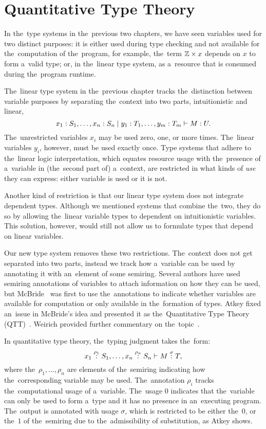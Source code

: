 \chapter{Quantitative Type Theory}\label{cha:qtt}

In the~type systems in the~previous two chapters, we have seen variables used
for two distinct purposes: it is either used during type checking and not
available for the~computation of the~program, for example, the~term $\mathbb{Z} \times
x$ depends on $x$ to form a~valid type; or, in the~linear type system, as
a~resource that is consumed during the~program runtime.

The~linear type system in the~previous chapter tracks the~distinction between
variable purposes by separating the~context into two parts, intuitionistic and
linear,
\[
  x_1 \stackrel{}: S_1, \dotsc, x_n \stackrel{}: S_n \mid y_1 \stackrel{}: T_1, \dotsc, y_m \stackrel{}: T_m
    \vdash M \stackrel{}: U.
\]
The~unrestricted variables $x_i$ may be used zero, one, or more times.
The~linear variables $y_i$, however, must be used exactly once. Type systems
that adhere to the~linear logic interpretation, which equates resource usage
with the~presence of a~variable in (the~second part of) a~context, are
restricted in what kinds of \emph{use} they can express: either variable is used
or it is not.

Another kind of restriction is that our linear type system does not integrate
dependent types. Although we mentioned systems that combine the~two, they do so
by allowing the~linear variable types to dependent on intuitionistic variables.
This solution, however, would still not allow us to formulate types that depend
on linear variables.

Our new type system removes these two restrictions. The~context does not get
separated into two parts, instead we track how a~variable can be used by
annotating it with an~element of some semiring. Several authors have used
semiring annotations of variables to attach information on how they can be used,
but McBride~\cite{mcbride_2016} was first to use the~annotations to indicate
whether variables are available for computation or only available in
the~formation of types. Atkey fixed an~issue in McBride's idea and presented it
as the~Quantitative Type Theory (QTT)~\cite{atkey_2018}. Weirich provided
further commentary on the~topic~\cite{weirich_2020}.


In quantitative type theory, the~typing judgment takes the~form:
\[
  x_1 \stackrel{\rho_1}: S_1, \dotsc, x_n \stackrel{\rho_n}: S_n \vdash M \stackrel{\sigma}: T,
\]
where the~$\rho_1, \dotsc, \rho_n$ are elements of the~semiring indicating
how the~corresponding variable may be used. The~annotation $\rho_i$ tracks
the~computational usage of a~variable. The~usage $0$ indicates that the~variable
can only be used to form a~type and it has no presence in an~executing program.
The~output is annotated with usage $\sigma$, which is restricted to be either
the~$0$, or the~$1$ of the~semiring due to the~admissibility of substitution, as
Atkey shows.

